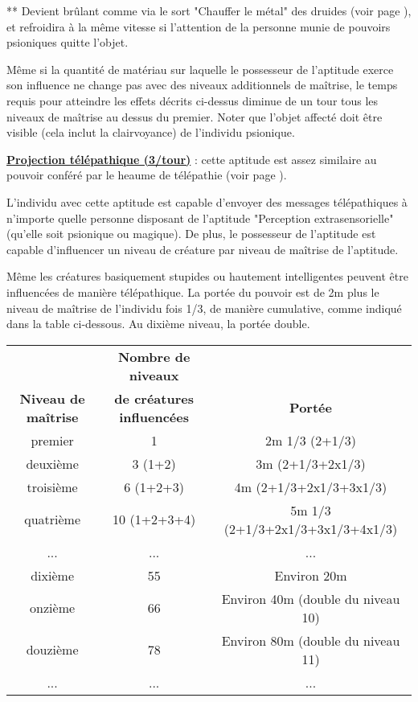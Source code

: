 \bigskip

** Devient brûlant comme via le sort "Chauffer le métal" des druides (voir page \pageref{sort-chauffe-metal}), et refroidira à la même vitesse si l'attention de la personne munie de pouvoirs psioniques quitte l'objet.

\bigskip

Même si la quantité de matériau sur laquelle le possesseur de l'aptitude exerce son influence ne change pas avec des niveaux additionnels de maîtrise, le temps requis pour atteindre les effets décrits ci-dessus diminue de un tour tous les niveaux de maîtrise au dessus du premier. Noter que l'objet affecté doit être visible (cela inclut la clairvoyance) de l'individu psionique.

\bigskip

\label{magicien-projection-telepathique}\textbf{\uline{Projection télépathique (3/tour)}} : cette aptitude est assez similaire au pouvoir conféré par le heaume de télépathie (voir page \pageref{objet-heaume-telepathie}).

\bigskip

L'individu avec cette aptitude est capable d'envoyer des messages télépathiques à n'importe quelle personne  disposant de l'aptitude "Perception extrasensorielle" (qu'elle soit psionique ou magique). De plus, le possesseur de l'aptitude est capable d'influencer un niveau de créature par niveau de maîtrise de l'aptitude.

\bigskip

Même les créatures basiquement stupides ou hautement intelligentes peuvent être influencées de manière télépathique. La portée du pouvoir est de 2m plus le niveau de maîtrise de l'individu fois 1/3, de manière cumulative, comme indiqué dans la table ci-dessous. Au dixième niveau, la portée double.

\bigskip

\begin{tabular}{ccc}
                            &\textbf{Nombre de niveaux} &\\
\textbf{Niveau de maîtrise} & \textbf{de créatures influencées} & \textbf{Portée}\\
premier     & 1             & 2m 1/3 (2+1/3)\\
deuxième    & 3 (1+2)       & 3m (2+1/3+2x1/3)\\
troisième   & 6 (1+2+3)     & 4m (2+1/3+2x1/3+3x1/3)\\
quatrième   & 10 (1+2+3+4)  & 5m 1/3 (2+1/3+2x1/3+3x1/3+4x1/3)\\
...         & ...           & ...\\
dixième     & 55            & Environ 20m \\
onzième     & 66            & Environ 40m (double du niveau 10) \\
douzième    & 78            & Environ 80m (double du niveau 11) \\
...         & ...           & ... \\
\end{tabular}


